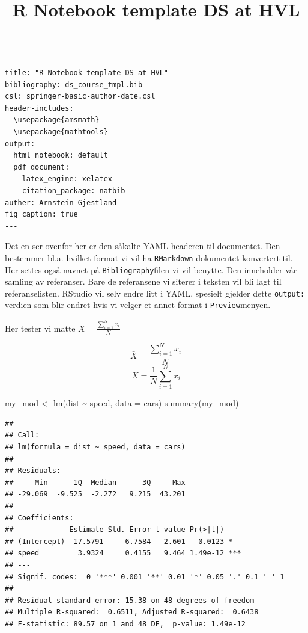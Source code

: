 \documentclass[
]{article}
\title{R Notebook template DS at HVL}
\author{}
\date{\vspace{-2.5em}}
\newenvironment{Shaded}{\begin{snugshade}}{\end{snugshade}}
\newcommand{\AttributeTok}[1]{\textcolor[rgb]{0.77,0.63,0.00}{#1}}
\newcommand{\FunctionTok}[1]{\textcolor[rgb]{0.00,0.00,0.00}{#1}}
\newcommand{\NormalTok}[1]{#1}
\newcommand{\OtherTok}[1]{\textcolor[rgb]{0.56,0.35,0.01}{#1}}
\newcommand{\SpecialCharTok}[1]{\textcolor[rgb]{0.00,0.00,0.00}{#1}}
\begin{document}
\maketitle

\begin{verbatim}
---
title: "R Notebook template DS at HVL"
bibliography: ds_course_tmpl.bib
csl: springer-basic-author-date.csl
header-includes:
- \usepackage{amsmath}
- \usepackage{mathtools}
output:
  html_notebook: default
  pdf_document:
    latex_engine: xelatex
    citation_package: natbib
auther: Arnstein Gjestland
fig_caption: true
---
\end{verbatim}

Det en ser ovenfor her er den såkalte YAML headeren til documentet. Den
bestemmer bl.a. hvilket format vi vil ha \texttt{RMarkdown} dokumentet
konvertert til. Her settes også navnet på \texttt{Bibliography}filen vi
vil benytte. Den inneholder vår samling av referanser. Bare de
referansene vi siterer i teksten vil bli lagt til referanselisten.
RStudio vil selv endre litt i YAML, spesielt gjelder dette
\texttt{output:} verdien som blir endret hvis vi velger et annet format
i \texttt{Preview}menyen.

Her tester vi matte \(\bar{X} = \frac{\sum_{i=1}^{N} x_i}{N}\)

\[\bar{X} = \frac{\sum_{i=1}^{N} x_i}{N}\]
\[\bar{X} = \frac{1}{N}\sum_{i=1}^{N} x_i\]

\begin{Shaded}
\begin{Highlighting}[]
\NormalTok{my\_mod }\OtherTok{\textless{}{-}} \FunctionTok{lm}\NormalTok{(dist }\SpecialCharTok{\textasciitilde{}}\NormalTok{ speed, }\AttributeTok{data =}\NormalTok{ cars)}
\FunctionTok{summary}\NormalTok{(my\_mod)}
\end{Highlighting}
\end{Shaded}

\begin{verbatim}
## 
## Call:
## lm(formula = dist ~ speed, data = cars)
## 
## Residuals:
##     Min      1Q  Median      3Q     Max 
## -29.069  -9.525  -2.272   9.215  43.201 
## 
## Coefficients:
##             Estimate Std. Error t value Pr(>|t|)    
## (Intercept) -17.5791     6.7584  -2.601   0.0123 *  
## speed         3.9324     0.4155   9.464 1.49e-12 ***
## ---
## Signif. codes:  0 '***' 0.001 '**' 0.01 '*' 0.05 '.' 0.1 ' ' 1
## 
## Residual standard error: 15.38 on 48 degrees of freedom
## Multiple R-squared:  0.6511, Adjusted R-squared:  0.6438 
## F-statistic: 89.57 on 1 and 48 DF,  p-value: 1.49e-12
\end{verbatim}
\end{document}
